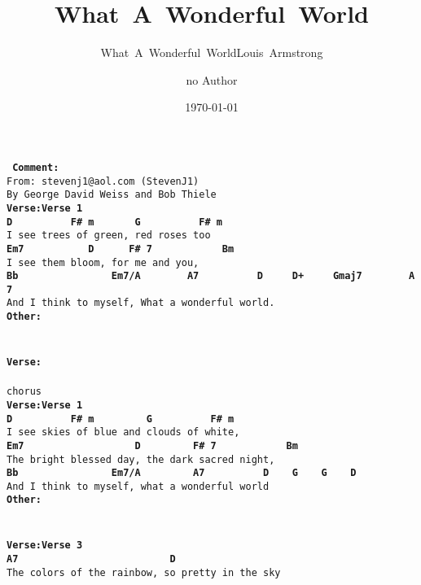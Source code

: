\documentclass{scrartcl}
\title{What~A~Wonderful~World}
\subtitle{What~A~Wonderful~WorldLouis~Armstrong}\author{no Author}
\date{\today}
\begin{document}
\maketitle
\texttt{
\textbf{Comment:} \\
From:~stevenj1@aol.com~(StevenJ1) \\
By~George~David~Weiss~and~Bob~Thiele \\
\textbf{Verse:Verse 1} \\
\textbf{ \hspace*{5em}D~~~~~~~~~~F\#~m~~~~~~~G~~~~~~~~~~F\#~m} \\
I~see~trees~of~green,~red~roses~too \\
\textbf{ Em7~~~~~~~~~~~D~~~~~~F\#~7~~~~~~~~~~~~Bm} \\
I~see~them~bloom,~for~me~and~you, \\
\textbf{ \hspace*{6em}Bb~~~~~~~~~~~~~~~~Em7/A~~~~~~~~A7~~~~~~~~~~D~~~~~D+~~~~~Gmaj7~~~~~~~~A7} \\
And~I~think~to~myself,~What~a~wonderful~world. \\
\textbf{Other:} \\
\textbf{ } \\
 \\
\textbf{Verse:} \\
\textbf{ } \\
chorus \\
\textbf{Verse:Verse 1} \\
\textbf{ \hspace*{5em}D~~~~~~~~~~F\#~m~~~~~~~~~G~~~~~~~~~~F\#~m} \\
I~see~skies~of~blue~and~clouds~of~white, \\
\textbf{ Em7~~~~~~~~~~~~~~~~~~~D~~~~~~~~~F\#~7~~~~~~~~~~~~Bm} \\
The~bright~blessed~day,~the~dark~sacred~night, \\
\textbf{ \hspace*{6em}Bb~~~~~~~~~~~~~~~~Em7/A~~~~~~~~~A7~~~~~~~~~~D~~~~G~~~~G~~~~D} \\
And~I~think~to~myself,~what~a~wonderful~world \\
\textbf{Other:} \\
\textbf{ } \\
 \\
\textbf{Verse:Verse 3} \\
\textbf{ \hspace*{4em}A7~~~~~~~~~~~~~~~~~~~~~~~~~~D} \\
The~colors~of~the~rainbow,~so~pretty~in~the~sky \\
}
\end{document}
